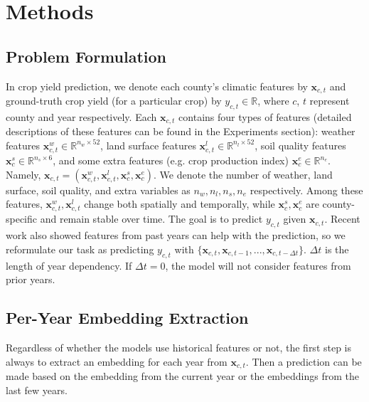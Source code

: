 \section{Methods}

\subsection{Problem Formulation}
In crop yield prediction, we denote each county's climatic features by $\mathbf{x}_{c,t}$ and ground-truth crop yield (for a particular crop) by $y_{c,t}\in \mathbb{R}$, where $c$, $t$ represent county and year respectively. Each $\mathbf{x}_{c,t}$ contains four types of features (detailed descriptions of these features can be found in the Experiments section): weather features $\mathbf{x}_{c,t}^w\in \mathbb{R}^{n_w\times 52}$, land surface features $\mathbf{x}_{c,t}^l\in \mathbb{R}^{n_l\times 52}$, soil quality features $\mathbf{x}_{c}^s\in \mathbb{R}^{n_s\times 6}$, and some extra features (e.g. crop production index) $\mathbf{x}_{c}^e\in \mathbb{R}^{n_e}$. Namely, $\mathbf{x}_{c,t}=(\mathbf{x}_{c,t}^w, \mathbf{x}_{c,t}^l, \mathbf{x}_{c}^s, \mathbf{x}_{c}^e)$. We denote the number of weather, land surface, soil quality, and extra variables as  $n_w, n_l, n_s, n_e$ respectively. Among these features, $\mathbf{x}_{c,t}^w, \mathbf{x}_{c,t}^l$ change both spatially and temporally, while $\mathbf{x}_{c}^s, \mathbf{x}_{c}^e$ are county-specific and remain stable over time. The goal is to predict $y_{c,t}$ given $\mathbf{x}_{c,t}$. Recent work \cite{khaki2020cnn} also showed features from past years can help with the prediction, so we reformulate our task as predicting $y_{c,t}$ with $\{\mathbf{x}_{c,t},\mathbf{x}_{c,t-1},...,\mathbf{x}_{c,t-\Delta t}\}$. $\Delta t$ is the length of year dependency. If $\Delta t=0$, the model will not consider features from prior years. 

\subsection{Per-Year Embedding Extraction}
Regardless of whether the models use historical features or not, the first step is always to extract an embedding for each year from $\mathbf{x}_{c,t}$. Then a prediction can be made based on the embedding from the current year or the embeddings from the last few years.

